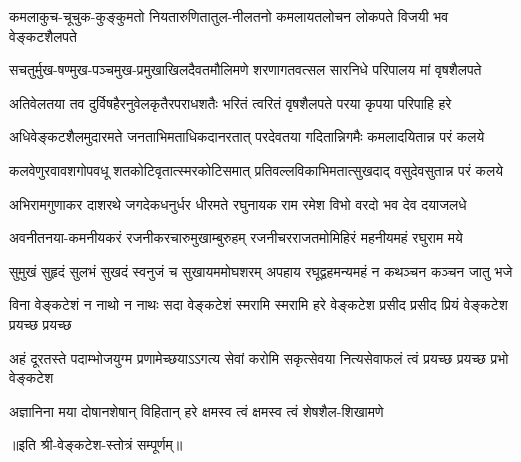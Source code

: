 
\twolineshloka
{कमलाकुच-चूचुक-कुङ्कुमतो नियतारुणितातुल-नीलतनो}
{कमलायतलोचन लोकपते विजयी भव वेङ्कटशैलपते}

\twolineshloka
{सचतुर्मुख-षण्मुख-पञ्चमुख-प्रमुखाखिलदैवतमौलिमणे}
{शरणागतवत्सल सारनिधे परिपालय मां वृषशैलपते}

\twolineshloka
{अतिवेलतया तव दुर्विषहैरनुवेलकृतैरपराधशतैः}
{भरितं त्वरितं वृषशैलपते परया कृपया परिपाहि हरे}

\twolineshloka
{अधिवेङ्कटशैलमुदारमते जनताभिमताधिकदानरतात्}
{परदेवतया गदितान्निगमैः कमलादयितान्न परं कलये}

\twolineshloka
{कलवेणुरवावशगोपवधू शतकोटिवृतात्स्मरकोटिसमात्}
{प्रतिवल्लविकाभिमतात्सुखदाद् वसुदेवसुतान्न परं कलये}

\twolineshloka
{अभिरामगुणाकर दाशरथे जगदेकधनुर्धर धीरमते}
{रघुनायक राम रमेश विभो वरदो भव देव दयाजलधे}

\twolineshloka
{अवनीतनया-कमनीयकरं रजनीकरचारुमुखाम्बुरुहम्}
{रजनीचरराजतमोमिहिरं महनीयमहं रघुराम मये}

\twolineshloka
{सुमुखं सुहृदं सुलभं सुखदं स्वनुजं च सुखायममोघशरम्}
{अपहाय रघूद्वहमन्यमहं न कथञ्चन कञ्चन जातु भजे}

\fourlineindentedshloka
{विना वेङ्कटेशं न नाथो न नाथः}
{सदा वेङ्कटेशं स्मरामि स्मरामि}
{हरे वेङ्कटेश प्रसीद प्रसीद}
{प्रियं वेङ्कटेश प्रयच्छ प्रयच्छ}%

\fourlineindentedshloka
{अहं दूरतस्ते पदाम्भोजयुग्म}
{प्रणामेच्छयाऽऽगत्य सेवां करोमि}
{सकृत्सेवया नित्यसेवाफलं त्वं}
{प्रयच्छ प्रयच्छ प्रभो वेङ्कटेश}

\twolineshloka
{अज्ञानिना मया दोषानशेषान् विहितान् हरे}
{क्षमस्व त्वं क्षमस्व त्वं शेषशैल-शिखामणे}

॥इति श्री-वेङ्कटेश-स्तोत्रं सम्पूर्णम्॥
